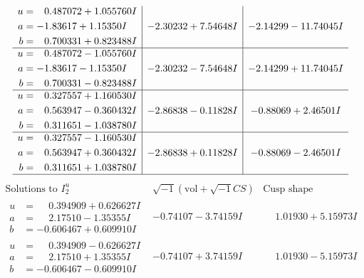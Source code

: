 \documentclass[1p]{elsarticle_modified}
\theoremstyle{definition}
\newcommand{\I}{\sqrt{-1}}
\begin{document}
$$\begin{array}{c|c|c}
\begin{aligned}
u &= \phantom{-}0.487072 + 1.055760 I \\
a &= -1.83617 + 1.15350 I \\
b &= \phantom{-}0.700331 + 0.823488 I\end{aligned}
 & -2.30232 + 7.54648 I & -2.14299 - 11.74045 I \\ \hline\begin{aligned}
u &= \phantom{-}0.487072 - 1.055760 I \\
a &= -1.83617 - 1.15350 I \\
b &= \phantom{-}0.700331 - 0.823488 I\end{aligned}
 & -2.30232 - 7.54648 I & -2.14299 + 11.74045 I \\ \hline\begin{aligned}
u &= \phantom{-}0.327557 + 1.160530 I \\
a &= \phantom{-}0.563947 - 0.360432 I \\
b &= \phantom{-}0.311651 - 1.038780 I\end{aligned}
 & -2.86838 - 0.11828 I & -0.88069 + 2.46501 I \\ \hline\begin{aligned}
u &= \phantom{-}0.327557 - 1.160530 I \\
a &= \phantom{-}0.563947 + 0.360432 I \\
b &= \phantom{-}0.311651 + 1.038780 I\end{aligned}
 & -2.86838 + 0.11828 I & -0.88069 - 2.46501 I\\
 \hline 
 \end{array}$$\newpage$$\begin{array}{c|c|c}  
\text{Solutions to }I^u_{2}& \I (\text{vol} + \sqrt{-1}CS) & \text{Cusp shape}\\
 \hline 
\begin{aligned}
u &= \phantom{-}0.394909 + 0.626627 I \\
a &= \phantom{-}2.17510 - 1.35355 I \\
b &= -0.606467 + 0.609910 I\end{aligned}
 & -0.74107 - 3.74159 I & \phantom{-}1.01930 + 5.15973 I \\ \hline\begin{aligned}
u &= \phantom{-}0.394909 - 0.626627 I \\
a &= \phantom{-}2.17510 + 1.35355 I \\
b &= -0.606467 - 0.609910 I\end{aligned}
 & -0.74107 + 3.74159 I & \phantom{-}1.01930 - 5.15973 I \\ \hline\begin{aligned}

\end{aligned}
\end{array}$$
\end{document}
